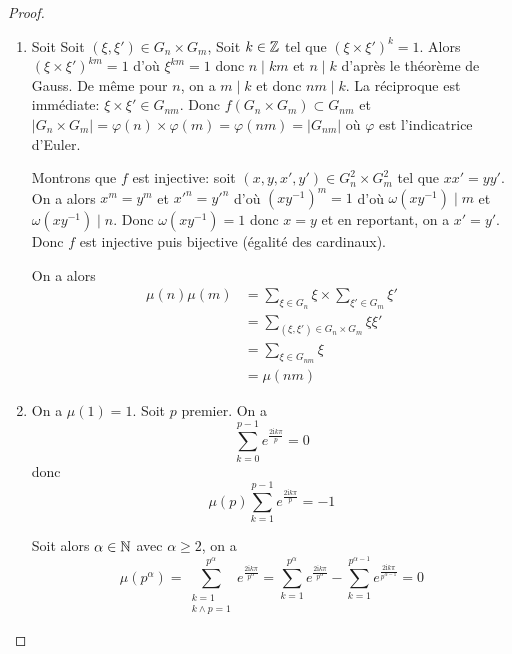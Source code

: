 \documentclass[12pt]{article}
\begin{document}
\begin{proof}
	\phantom{}
	\begin{enumerate}
		\item Soit 
		Soit $(\xi,\xi')\in G_{n}\times G_{m}$, Soit $k\in\mathbb{Z}$ tel que $(\xi\times\xi')^{k}=1$. Alors $(\xi\times\xi')^{km}=1$ d'où $\xi^{km}=1$ donc $n\mid km$ et $n\mid k$ d'après le théorème de Gauss. De même pour $n$, on a $m\mid k$ et donc $nm\mid k$. La réciproque est immédiate: $\xi\times\xi'\in G_{nm}$. Donc $f(G_{n}\times G_{m})\subset G_{nm}$ et $\vert G_{n}\times G_{m}\vert=\varphi(n)\times\varphi(m)=\varphi(nm)=\vert G_{nm}\vert$ où $\varphi$ est l'indicatrice d'Euler.

		Montrons que $f$ est injective: soit $(x,y,x',y')\in G_{n}^{2}\times G_{m}^{2}$ tel que $xx'=yy'$. On a alors $x^{m}=y^{m}$ et $x'^{n}=y'^{n}$ d'où $(xy^{-1})^{m}=1$ d'où $\omega(xy^{-1})\mid m$ et $\omega(xy^{-1})\mid n$. Donc $\omega(xy^{-1})=1$ donc $x=y$ et en reportant, on a $x'=y'$. Donc $f$ est injective puis bijective (égalité des cardinaux).

		On a alors 
		\begin{align}
			\mu(n)\mu(m)
			&=\sum_{\xi\in G_{n}}\xi\times\sum_{\xi'\in G_{m}}\xi'\\
			&=\sum_{(\xi,\xi')\in G_{n}\times G_{m}}\xi\xi'\\
			&=\sum_{\xi\in G_{nm}}\xi\\
			&=\boxed{\mu(nm)}
		\end{align}

		\item On a $\mu(1)=1$. Soit $p$ premier. On a 
		\begin{equation}
			\sum_{k=0}^{p-1}e^{\frac{2\mathrm{i}k\pi}{p}}=0
		\end{equation} 
		donc 
		\begin{equation}
			\mu(p)\sum_{k=1}^{p-1}e^{\frac{2\mathrm{i}k\pi}{p}}=-1	
		\end{equation}
		
		Soit alors $\alpha\in\mathbb{N}$ avec $\alpha\geqslant2$, on a 
		\begin{equation}
			\boxed{
			\mu(p^{\alpha})=\sum_{\substack{k=1\\ k\wedge p=1}}^{p^{\alpha}}e^{\frac{2\mathrm{i}k\pi}{p^{\alpha}}}=\sum_{k=1}^{p^{\alpha}}e^{\frac{2\mathrm{i}k\pi}{p^{\alpha}}}-\sum_{k=1}^{p^{\alpha-1}}e^{\frac{2\mathrm{i}k\pi}{p^{\alpha-1}}}=0}
		\end{equation}


\end{enumerate}
\end{proof}
\end{document}
